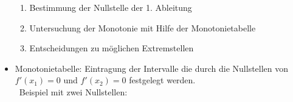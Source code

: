 \documentclass[a4paper,twocolumn,10pt]{onepgnote}
\renewcommand\mynote{\notebox{Hinweis:}\ }  %
\begin{document}
\begin{itemize}
 \begin{enumerate}
     \item Bestimmung der Nullstelle der 1. Ableitung\\
     \item Untersuchung der Monotonie mit Hilfe der Monotonietabelle\\
     \item Entscheidungen zu möglichen Extremstellen
 \end{enumerate}
 \item Monotonietabelle: Eintragung der Intervalle die durch die Nullstellen von $f'(x_1)= 0$ und $f'(x_2)=0$ festgelegt werden.\\
\mynote Beispiel mit zwei Nullstellen:\\
 \end{itemize}
\end{document}
